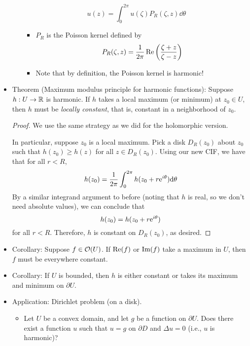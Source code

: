 \documentclass[../notes.tex]{subfiles}
\begin{document}
\begin{itemize}
\begin{itemize}
\begin{equation*}
            u(z) = \int_0^{2\pi}u(\zeta)P_R(\zeta,z)\dd\theta
        \end{equation*}
        \begin{itemize}
            \item $P_R$ is the Poisson kernel defined by
            \begin{equation*}
                P_R(\zeta,z) = \frac{1}{2\pi}\re\left( \frac{\zeta+z}{\zeta-z} \right)
            \end{equation*}
            \item Note that by definition, the Poisson kernel is harmonic!
        \end{itemize}
    \end{itemize}
    \item Theorem (Maximum modulus principle for harmonic functions): Suppose $h:U\to\R$ is harmonic. If $h$ takes a local maximum (or minimum) at $z_0\in U$, then $h$ must be \emph{locally constant}, that is, constant in a neighborhood of $z_0$.
    \begin{proof}
        We use the same strategy as we did for the holomorphic version.\par
        In particular, suppose $z_0$ is a local maximum. Pick a disk $D_R(z_0)$ about $z_0$ such that $h(z_0)\geq h(z)$ for all $z\in D_R(z_0)$. Using our new CIF, we have that for all $r<R$,
        \begin{equation*}
            h(z_0) = \frac{1}{2\pi}\int_0^{2\pi}h(z_0+r\e[i\theta])\dd\theta
        \end{equation*}
        By a similar integrand argument to before (noting that $h$ is real, so we don't need absolute values), we can conclude that
        \begin{equation*}
            h(z_0) = h(z_0+r\e[i\theta])
        \end{equation*}
        for all $r<R$. Therefore, $h$ is constant on $D_R(z_0)$, as desired.
    \end{proof}
    \item Corollary: Suppose $f\in\mO(U)$. If $\re(f)$ or $\im(f)$ take a maximum in $U$, then $f$ must be everywhere constant.
    \item Corollary: If $U$ is bounded, then $h$ is either constant or takes its maximum and minimum on $\partial U$.
    \item Application: Dirichlet problem (on a disk).
    \begin{itemize}
        \item Let $U$ be a convex domain, and let $g$ be a function on $\partial U$. Does there exist a function $u$ such that $u=g$ on $\partial D$ and $\Delta u=0$ (i.e., $u$ is harmonic)?

\end{itemize}
\end{itemize}
\end{document}
